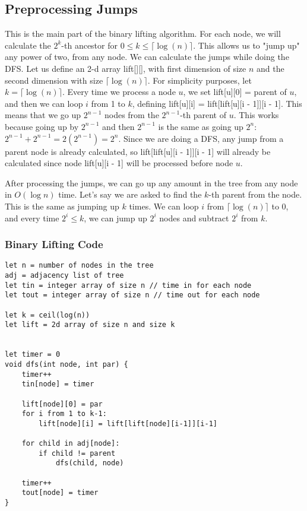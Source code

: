 \documentclass{article}
\begin{document}
\subsection{Preprocessing Jumps}
This is the main part of the binary lifting algorithm. For each node, we will calculate the $2^k$-th ancestor for $0 \leq k \leq \lceil \log (n) \rceil$. This allows us to "jump up" any power of two, from any node. We can calculate the jumps while doing the DFS. Let us define an 2-d array lift[][], with first dimension of size $n$ and the second dimension with size $\lceil \log (n) \rceil$. For simplicity purposes, let $k = \lceil \log (n) \rceil$. Every time we process a node $u$, we set lift[u][0] = parent of $u$, and then we can loop $i$ from 1 to $k$, defining lift[u][i] = lift[lift[u][i - 1]][i - 1]. This means that we go up $2^{n - 1}$ nodes from the $2^{n - 1}$-th parent of $u$. This works because going up by $2^{n - 1}$ and then $2^{n - 1}$ is the same as going up $2^{n}$: $2^{n - 1} + 2^{n - 1} = 2(2^{n - 1}) = 2^n$. Since we are doing a DFS, any jump from a parent node is already calculated, so lift[lift[u][i - 1]][i - 1] will already be calculated since node lift[u][i - 1] will be processed before node $u$.

After processing the jumps, we can go up any amount in the tree from any node in $O(\log n)$ time. Let's say we are asked to find the $k$-th parent from the node. This is the same as jumping up $k$ times. We can loop $i$ from $\lceil \log (n) \rceil$ to 0, and every time $2^i \leq k$, we can jump up $2^i$ nodes and subtract $2^i$ from $k$. 

\subsubsection{Binary Lifting Code}
\begin{lstlisting}
let n = number of nodes in the tree
adj = adjacency list of tree
let tin = integer array of size n // time in for each node
let tout = integer array of size n // time out for each node

let k = ceil(log(n))
let lift = 2d array of size n and size k


let timer = 0
void dfs(int node, int par) {
	timer++
	tin[node] = timer
	
	lift[node][0] = par
	for i from 1 to k-1:
		lift[node][i] = lift[lift[node][i-1]][i-1]
	
	for child in adj[node]:
		if child != parent
			dfs(child, node)
	
	timer++
	tout[node] = timer
}
\end{lstlisting}
\end{document}
